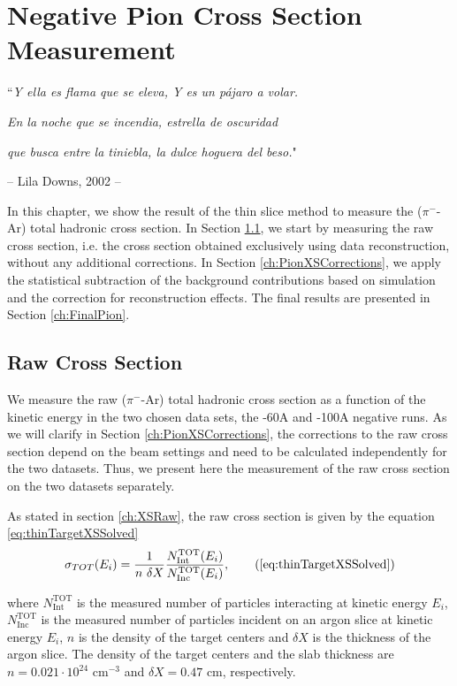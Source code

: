 \chapter{Negative Pion Cross Section Measurement}\label{ch:PionXS}
{\raggedleft ``\emph{Y ella es flama que se eleva, Y es un p\'ajaro a volar.} \par}
{\raggedleft \emph{En la noche que se incendia, estrella de oscuridad}\par}
{\raggedleft \emph{que busca entre la tiniebla, la dulce hoguera del beso.}"\par}
{\raggedleft -- Lila Downs,   2002 -- \par}%
\vspace{0.5cm}

In this chapter, we show the result of the thin slice method to measure 
the ($\pi^-$-Ar) total hadronic cross section. In Section \ref{ch:PionXSRaw}, we start by measuring the raw cross section, i.e. the cross section obtained exclusively using data reconstruction, without any additional corrections. In Section \ref{ch:PionXSCorrections}, we apply the statistical subtraction of the background contributions based on simulation and the correction for reconstruction effects. The final results are presented in Section \ref{ch:FinalPion}.


\section{Raw Cross Section}\label{ch:PionXSRaw}
We measure the raw ($\pi^-$-Ar) total hadronic cross section as a function of the kinetic energy in the two chosen data sets, the -60A and -100A negative runs. 
As we will clarify in Section \ref{ch:PionXSCorrections},  the corrections to the raw cross section depend on the beam settings and need to be calculated independently for the two datasets. Thus, we present here the measurement of the raw cross section on the two datasets separately.


As stated in section \ref{ch:XSRaw},  the raw cross section is given by the equation \ref{eq:thinTargetXSSolved}
\begin{equation}
 \sigma_{TOT} (E_i)  = \frac{1}{n\text{ } \delta X}\frac{N^{\text{TOT}}_{\text{Int}}(E_i)}{N^{\text{TOT}}_{\text{Inc}}(E_i)},  \tag{\ref{eq:thinTargetXSSolved}}
\end{equation}

where $N^{\text{TOT}}_{\text{Int}}$  is the measured number of particles interacting at kinetic energy $E_i$, $N^{\text{TOT}}_{\text{Inc}}$ is the  measured  number of particles incident  on an argon slice at  kinetic energy $E_i$,  $n$ is the density of the target centers  and $\delta X$ is the thickness of the argon slice. The density of the target centers and the slab thickness are $n = 0.021\cdot10^{24} \text{ cm}^{-3} $ and  $\delta X=0.47\text{ cm}$, respectively.


